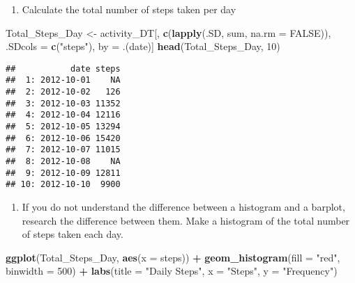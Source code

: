 \documentclass[]{article}
\newenvironment{Shaded}{\begin{snugshade}}{\end{snugshade}}
\newcommand{\KeywordTok}[1]{\textcolor[rgb]{0.13,0.29,0.53}{\textbf{#1}}}
\newcommand{\DataTypeTok}[1]{\textcolor[rgb]{0.13,0.29,0.53}{#1}}
\newcommand{\DecValTok}[1]{\textcolor[rgb]{0.00,0.00,0.81}{#1}}
\newcommand{\StringTok}[1]{\textcolor[rgb]{0.31,0.60,0.02}{#1}}
\newcommand{\OtherTok}[1]{\textcolor[rgb]{0.56,0.35,0.01}{#1}}
\newcommand{\OperatorTok}[1]{\textcolor[rgb]{0.81,0.36,0.00}{\textbf{#1}}}
\newcommand{\NormalTok}[1]{#1}
\providecommand{\tightlist}{%
  \setlength{\itemsep}{0pt}\setlength{\parskip}{0pt}}
\begin{document}
\begin{enumerate}
\def\labelenumi{\arabic{enumi}.}
\tightlist
\item
  Calculate the total number of steps taken per day
\end{enumerate}

\begin{Shaded}
\begin{Highlighting}[]
\NormalTok{Total_Steps_Day <-}\StringTok{ }\NormalTok{activity_DT[, }\KeywordTok{c}\NormalTok{(}\KeywordTok{lapply}\NormalTok{(.SD, sum, }\DataTypeTok{na.rm =} \OtherTok{FALSE}\NormalTok{)), .SDcols =}\StringTok{ }\KeywordTok{c}\NormalTok{(}\StringTok{"steps"}\NormalTok{), by =}\StringTok{ }\NormalTok{.(date)] }
\KeywordTok{head}\NormalTok{(Total_Steps_Day, }\DecValTok{10}\NormalTok{)}
\end{Highlighting}
\end{Shaded}

\begin{verbatim}
##           date steps
##  1: 2012-10-01    NA
##  2: 2012-10-02   126
##  3: 2012-10-03 11352
##  4: 2012-10-04 12116
##  5: 2012-10-05 13294
##  6: 2012-10-06 15420
##  7: 2012-10-07 11015
##  8: 2012-10-08    NA
##  9: 2012-10-09 12811
## 10: 2012-10-10  9900
\end{verbatim}

\begin{enumerate}
\def\labelenumi{\arabic{enumi}.}
\setcounter{enumi}{1}
\tightlist
\item
  If you do not understand the difference between a histogram and a
  barplot, research the difference between them. Make a histogram of the
  total number of steps taken each day.
\end{enumerate}

\begin{Shaded}
\begin{Highlighting}[]
\KeywordTok{ggplot}\NormalTok{(Total_Steps_Day, }\KeywordTok{aes}\NormalTok{(}\DataTypeTok{x =}\NormalTok{ steps)) }\OperatorTok{+}
\StringTok{  }\KeywordTok{geom_histogram}\NormalTok{(}\DataTypeTok{fill =} \StringTok{"red"}\NormalTok{, }\DataTypeTok{binwidth =} \DecValTok{500}\NormalTok{) }\OperatorTok{+}
\StringTok{  }\KeywordTok{labs}\NormalTok{(}\DataTypeTok{title =} \StringTok{"Daily Steps"}\NormalTok{, }\DataTypeTok{x =} \StringTok{"Steps"}\NormalTok{, }\DataTypeTok{y =} \StringTok{"Frequency"}\NormalTok{)}
\end{Highlighting}
\end{Shaded}
\end{document}
